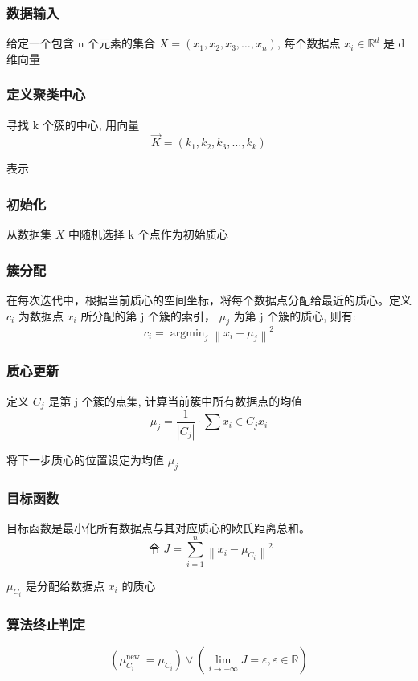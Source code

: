 \documentclass[12pt]{ctexart}
\begin{document}
	\subsubsection{数据输入}
	给定一个包含 n 个元素的集合 $X=\left(x_1, x_2, x_3, \ldots, x_n\right)$,
	每个数据点 $x_i \in \mathbb{R}^d$ 是 d 维向量
	\subsubsection{定义聚类中心}
	寻找 k 个簇的中心, 用向量
	 \begin{equation}\vec{K}=\left(k_1, k_2, k_3, \ldots, k_k\right)\end{equation}
	 
	 表示
	\subsubsection{初始化}
	从数据集 $X$ 中随机选择 k 个点作为初始质心
	\subsubsection{簇分配}
	在每次迭代中，根据当前质心的空间坐标，将每个数据点分配给最近的质心。定义 $c_i$ 为数据点 $x_i$ 所分配的第 j 个簇的索引， $\mu_j$ 为第 j 个簇的质心, 则有:
\begin{equation}
	c_i=\operatorname{argmin}_j\left\|x_i-\mu_j\right\|^2
\end{equation}
	\subsubsection{质心更新}
	定义 $C_j$ 是第 j 个簇的点集, 计算当前簇中所有数据点的均值
	 \begin{equation}\mu_j=\frac{1}{\left|C_j\right|} \cdot \sum x_i \in C_j x_i
	 \end{equation}
	 
	 
	将下一步质心的位置设定为均值 $\mu_j$
	\subsubsection{目标函数}
	目标函数是最小化所有数据点与其对应质心的欧氏距离总和。
\begin{equation}
	\text { 令 } J=\sum_{i=1}^n\left\|x_i-\mu_{C_i}\right\|^2
\end{equation}

	$\mu_{C_i}$ 是分配给数据点 $x_i$ 的质心
	\subsubsection{算法终止判定}
\begin{equation}
	\left(\mu_{C_i}^{\text {new }}=\mu_{C_i}\right) \vee\left(\lim _{i \rightarrow+\infty} J=\varepsilon, \varepsilon \in \mathbb{R}\right)
\end{equation}
\end{document}
